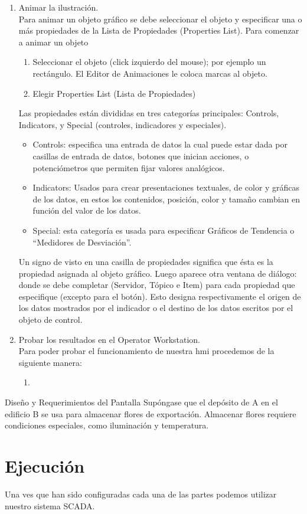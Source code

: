 \begin{enumerate}
 \item Animar la ilustración.\\
      Para animar un objeto gráfico se debe seleccionar el objeto y especificar una o
      más propiedades de la Lista de Propiedades (Properties List).
      Para comenzar a animar un objeto
      \begin{enumerate}
	\item Seleccionar el objeto (click izquierdo del mouse); por ejemplo un rectángulo. El
	Editor de Animaciones le coloca marcas al objeto.
	\item Elegir Properties List (Lista de Propiedades) 
      \end{enumerate}
      Las propiedades están divididas en tres
      categorías principales: Controls, Indicators, y Special 
      (controles, indicadores y especiales).
      \begin{itemize}
	\item  Controls: especifica una entrada de datos la cual puede estar dada por 
	casillas de entrada de datos, botones que inician acciones, o
	potenciómetros que permiten fijar valores analógicos.
	\item Indicators: Usados para crear presentaciones textuales, de color
	y gráficas de los datos, en estos los contenidos, posición, color y
	tamaño cambian en función del valor de los datos.
	\item Special: esta categoría es usada para especificar Gráficos de Tendencia o
	“Medidores de Desviación”.
      \end{itemize}
      Un signo de visto en una casilla de propiedades significa que ésta es la propiedad
      asignada al objeto gráfico. Luego aparece otra ventana de diálogo:
      donde se debe completar (Servidor, Tópico e Item) para cada
      propiedad que especifique (excepto para el botón). Esto designa
      respectivamente el origen de los datos mostrados por el indicador o 
      el destino de los datos escritos por el objeto de control.
      
 \item Probar los resultados en el Operator Workstation.\\
      Para poder probar el funcionamiento de nuestra \gls{hmi} procedemos de la siguiente manera:
      \begin{enumerate}
       \item 
      \end{enumerate}

\end{enumerate}


Diseño y Requerimientos del Pantalla
Supóngase que el depósito de A en el edificio B se usa para almacenar flores de
exportación. Almacenar flores requiere condiciones especiales, como iluminación y
temperatura. 


\section{Ejecución}
\label{sec:Ejecucion}

Una ves que han sido configuradas cada una de las partes podemos utilizar nuestro sistema SCADA.

